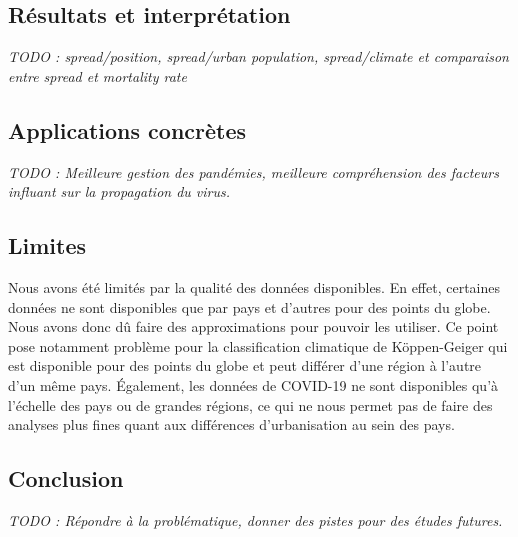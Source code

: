 \documentclass[12pt]{iEEEtran}
\begin{document}
\subsection{Résultats et interprétation}
\textit{TODO : spread/position, spread/urban population, spread/climate et comparaison entre
spread et mortality rate}

\subsection{Applications concrètes}
\textit{TODO : Meilleure gestion des pandémies, meilleure compréhension des facteurs
influant sur la propagation du virus.}
\subsection{Limites}
Nous avons été limités par la qualité des données disponibles. En effet, certaines données
ne sont disponibles que par pays et d'autres pour des points du globe. Nous avons donc dû
faire des approximations pour pouvoir les utiliser. Ce point pose notamment problème pour
la classification climatique de Köppen-Geiger qui est disponible pour des points du globe et
peut différer d'une région à l'autre d'un même pays. Également, les données de COVID-19
ne sont disponibles qu'à l'échelle des pays ou de grandes régions, ce qui ne nous permet
pas de faire des analyses plus fines quant aux différences d'urbanisation au sein des pays.

\subsection{Conclusion}
\textit{TODO : Répondre à la problématique, donner des pistes pour des études futures.}




\newpage
\end{document}
